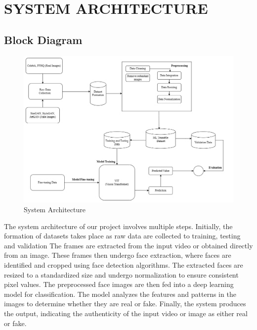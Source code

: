 \section{SYSTEM ARCHITECTURE}
\subsection{Block Diagram}
\begin{figure}[h]
    \centering
    \includegraphics[width= 6.5in ]{img/Model_Architecture.drawio (4).png}
    \caption{{System Architecture}}

\end{figure}
\justify
The system architecture of our project involves multiple steps. Initially, the formation of datasets takes place as raw data are collected to training, testing and validation  The frames are extracted from the input video or obtained directly from an image. These frames then undergo face extraction, where faces are identified and cropped using face detection algorithms. The extracted faces are resized to a standardized size and undergo normalization to ensure consistent pixel values. The preprocessed face images are then fed into a deep learning model for classification. The model analyzes the features and patterns in the images to determine whether they are real or fake. Finally, the system produces the output, indicating the authenticity of the input video or image as either real or fake.
